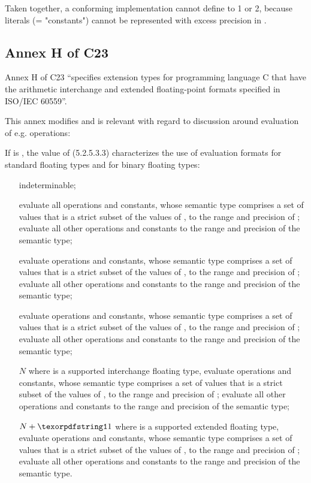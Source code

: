 Taken together, a conforming \CC{} implementation cannot define
 to 1 or 2, because literals (= "constants") cannot be
represented with excess precision in \CC{}.

\subsection{Annex H of C23}

Annex H of C23 “specifies extension types for programming language C that have
the arithmetic interchange and extended floating-point formats specified in
ISO/IEC 60559”.

This annex modifies  and is relevant with regard to
discussion around evaluation of e.g.  operations:
\begin{wgText}
  \setcounter{Paras}{1}\pnum
  If  is , the value of 
  (5.2.5.3.3) characterizes the use of evaluation formats for standard floating
  types and for binary floating types:
  \begin{itemize}
    \item[\code{-1}] indeterminable;
    \item [\code 0] evaluate all operations and constants, whose semantic type
      comprises a set of values that is a strict subset of the values of
      \float, to the range and precision of \float; evaluate all other
      operations and constants to the range and precision of the semantic type;
    \item [\code 1] evaluate operations and constants, whose semantic type comprises
      a set of values that is a strict subset of the values of \double, to the
      range and precision of \double; evaluate all other operations and
      constants to the range and precision of the semantic type;
    \item [\code 2] evaluate operations and constants, whose semantic type comprises
      a set of values that is a strict subset of the values of , to the range and precision of ; evaluate all
      other operations and constants to the range and precision of the semantic
      type;
    \item [$N$] where  is a supported interchange floating
      type, evaluate operations and constants, whose semantic type comprises a
      set of values that is a strict subset of the values of ,
      to the range and precision of ; evaluate all other
      operations and constants to the range and precision of the semantic type;
    \item [$N + \code{1}$] where  is a supported extended
      floating type, evaluate operations and constants, whose semantic type
      comprises a set of values that is a strict subset of the values of
      , to the range and precision of ;
      evaluate all other operations and constants to the range and precision of
      the semantic type.
  \end{itemize}
\end{wgText}

